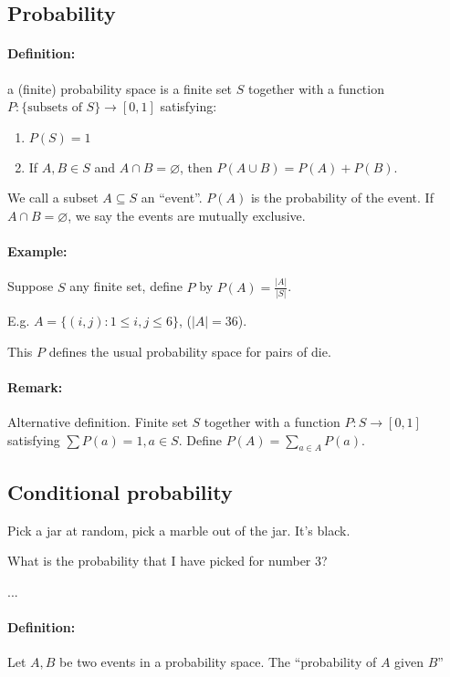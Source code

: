 \documentclass[a4paper, 11pt, twoside]{article}
\begin{document}
\subsection{Probability}

\paragraph{Definition:} a (finite) probability space is a finite set $S$ together with a function $P: \{\text{subsets of } S\} \rightarrow [0, 1]$ satisfying:

\begin{enumerate}
	\item $P(S)= 1$
	\item If $A, B \in S$ and $A\cap B=\varnothing$, then $P(A\cup B)=P(A)+P(B)$.
\end{enumerate}

We call a subset $A\subseteq S$ an ``event''. $P(A)$ is the probability of the event. If $A\cap B=\varnothing$, we say the events are mutually exclusive.\\

\paragraph{Example:} Suppose $S$ any finite set, define $P$ by $P(A)=\frac{|A|}{|S|}$.

E.g. $A=\{(i,j): 1\leq i, j\leq 6\}$, ($|A|=36$).

This $P$ defines the usual probability space for pairs of die.

\paragraph{Remark:} Alternative definition. Finite set $S$ together with a function $P: S\rightarrow [0,1]$ satisfying $\sum P(a)=1, a\in S$. Define $P(A)=\sum_{a\in A}P(a)$.

\subsection{Conditional probability}

Pick a jar at random, pick a marble out of the jar. It's black.

What is the probability that I have picked for number 3?

...

\paragraph{Definition:} Let $A,B$ be two events in a probability space. The ``probability of $A$ given $B$''
\end{document}

